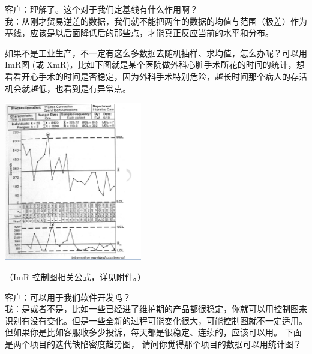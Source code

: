 客户：理解了。这个对于我们定基线有什么作用啊？\\
我：从刚才贸易逆差的数据，我们就不能把两年的数据的均值与范围（极差）作为基线，应该是以后面降低后的那些点，才能真正反应当前的水平和分布。

如果不是工业生产，不一定有这么多数据去随机抽样、求均值，怎么办呢？可以用ImR图
(或
XmR)，比如下图就是某个医院做外科心脏手术所花的时间的统计，想看看开心手术的时间是否稳定，因为外科手术特别危险，越长时间那个病人的存活机会就越低，也看到是有异常点。


\includegraphics[width=6cm]{控制图08.png}

（ImR 控制图相关公式，详见附件。）

客户：可以用于我们软件开发吗？\\
我：是或者不是，比如一些已经进了维护期的产品都很稳定，你就可以用控制图来识别有没有变化。但是一些全新的过程可能变化很大，可能控制图就不一定适用。但如果你是比如客服收多少投诉，每天都是很稳定、连续的，应该可以用。
下面是两个项目的迭代缺陷密度趋势图，
请问你觉得那个项目的数据可以用统计图？\\

